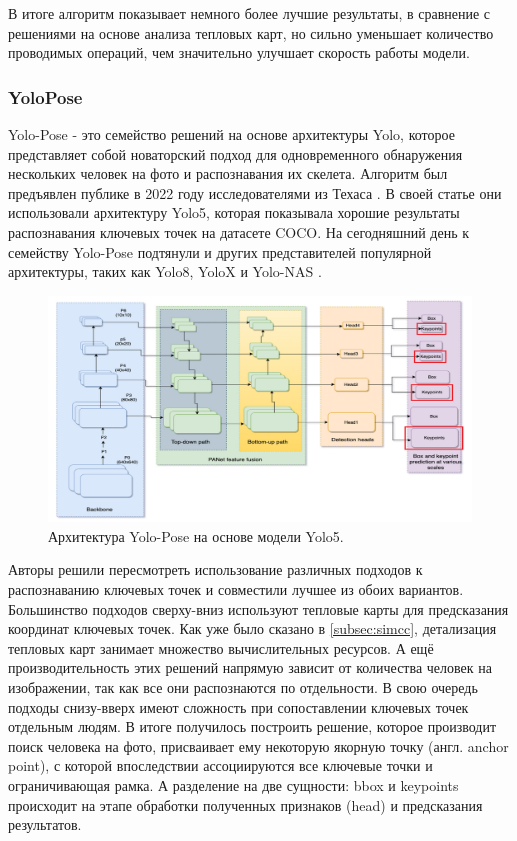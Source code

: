 В итоге алгоритм показывает немного более лучшие результаты, в сравнение с решениями на основе анализа тепловых карт, но сильно уменьшает количество проводимых операций, чем значительно улучшает скорость работы модели.

\subsubsection*{YoloPose}

Yolo-Pose - это семейство решений на основе архитектуры Yolo, которое представляет собой новаторский подход для одновременного обнаружения нескольких человек на фото и распознавания их скелета. Алгоритм был предъявлен публике в 2022 году исследователями из Техаса \cite{yolo_pose}. В своей статье они использовали архитектуру Yolo5, которая показывала хорошие результаты распознавания ключевых точек на датасете COCO. На сегодняшний день к семейству Yolo-Pose подтянули и других представителей популярной архитектуры, таких как Yolo8, YoloX и Yolo-NAS \cite{yolo8, yolox}.

\begin{figure}[h]
	\centering
	\includegraphics[width=\textwidth]{./images/review/yolo_pose}
	\caption{Архитектура Yolo-Pose на основе модели Yolo5. \cite{yolo_pose}}
	\label{fig:yolo_pose}
\end{figure}

Авторы решили пересмотреть использование различных подходов к распознаванию ключевых точек и совместили лучшее из обоих вариантов. Большинство подходов сверху-вниз используют тепловые карты для предсказания координат ключевых точек. Как уже было сказано в \autoref{subsec:simcc}, детализация тепловых карт занимает множество вычислительных ресурсов. А ещё производительность этих решений напрямую зависит от количества человек на изображении, так как все они распознаются по отдельности. В свою очередь подходы снизу-вверх имеют сложность при сопоставлении ключевых точек отдельным людям. В итоге получилось построить решение, которое производит поиск человека на фото, присваивает ему некоторую якорную точку (англ. anchor point), с которой впоследствии ассоциируются все ключевые точки и ограничивающая рамка. А разделение на две сущности: bbox и keypoints происходит на этапе обработки полученных признаков (head) и предсказания результатов.

